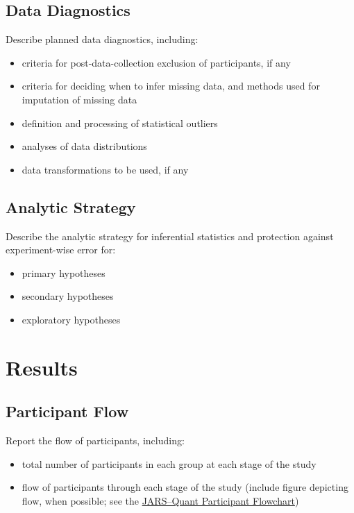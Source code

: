 \documentclass[acmsmall,screen,anonymous,review]{acmart}
\begin{document}
\subsection{Data Diagnostics}

Describe planned data diagnostics, including:
\begin{itemize}
    \item criteria for post-data-collection exclusion of participants, if any
    \item criteria for deciding when to infer missing data, and methods used for imputation of missing data
    \item definition and processing of statistical outliers
    \item analyses of data distributions
    \item data transformations to be used, if any
\end{itemize}

\subsection{Analytic Strategy}

Describe the analytic strategy for inferential statistics and protection against experiment-wise error for:
\begin{itemize}
    \item primary hypotheses
    \item secondary hypotheses
    \item exploratory hypotheses
\end{itemize}

\section{Results}

\subsection{Participant Flow}
Report the flow of participants, including:
\begin{itemize}
    \item total number of participants in each group at each stage of the study
    \item flow of participants through each stage of the study (include figure depicting flow, when possible; see the \href{https://apastyle.apa.org/jars/jars-quant-participant-flowchart.pdf}{JARS–Quant Participant Flowchart})
\end{itemize}
\end{document}
